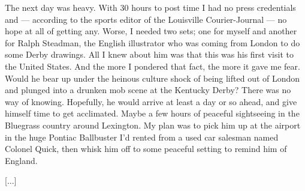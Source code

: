 \documentclass[9pt,a4paper]{extarticle}
\begin{document}
The next day was heavy. With 30 hours to post time I had no press credentials and — according to the sports editor of the Louisville Courier-Journal — no hope at all of getting any. Worse, I needed two sets; one for myself and another for Ralph Steadman, the English illustrator who was coming from London to do some Derby drawings. All I knew about him was that this was his first visit to the United States. And the more I pondered that fact, the more it gave me fear. Would he bear up under the heinous culture shock of being lifted out of London and plunged into a drunken mob scene at the Kentucky Derby? There was no way of knowing. Hopefully, he would arrive at least a day or so ahead, and give himself time to get acclimated. Maybe a few hours of peaceful sightseeing in the Bluegrass country around Lexington. My plan was to pick him up at the airport in the huge Pontiac Ballbuster I’d rented from a used car salesman named Colonel Quick, then whisk him off to some peaceful setting to remind him of England.

[...]
\end{document}
